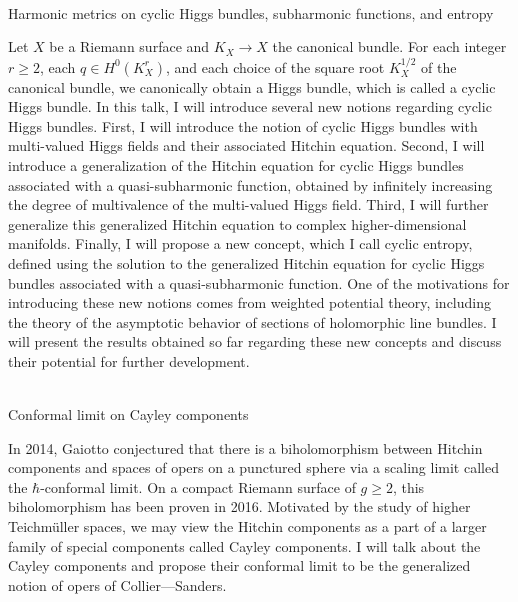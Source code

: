\documentclass[dvipdfmx,a4paper,12pt]{article}
\theoremstyle{plain} %
\theoremstyle{definition} %
\begin{document}
\\
Harmonic metrics on cyclic Higgs bundles, subharmonic functions, and entropy

\vskip1mm
Let $X$ be a Riemann surface and $K_X \rightarrow X$ the canonical bundle. For each integer $r \geq 2$, each $q \in H^0(K_X^r)$, and each choice of the square root $K_X^{1/2}$ of the canonical bundle, we canonically obtain a Higgs bundle, which is called a cyclic Higgs bundle. In this talk, I will introduce several new notions regarding cyclic Higgs bundles. First, I will introduce the notion of cyclic Higgs bundles with multi-valued Higgs fields and their associated Hitchin equation. Second, I will introduce a generalization of the Hitchin equation for cyclic Higgs bundles associated with a quasi-subharmonic function, obtained by infinitely increasing the degree of multivalence of the multi-valued Higgs field. Third, I will further generalize this generalized Hitchin equation to complex higher-dimensional manifolds. Finally, I will propose a new concept, which I call cyclic entropy, defined using the solution to the generalized Hitchin equation for cyclic Higgs bundles associated with a quasi-subharmonic function. One of the motivations for introducing these new notions comes from weighted potential theory, including the theory of the asymptotic behavior of sections of holomorphic line bundles. I will present the results obtained so far regarding these new concepts and discuss their potential for further development.
\vskip5mm

\\
Conformal limit on Cayley components

\vskip1mm
In 2014, Gaiotto conjectured that there is a biholomorphism between Hitchin components and spaces of opers on a punctured sphere via a scaling limit called the $\hbar$-conformal limit. On a compact Riemann surface of $g \ge 2$, this biholomorphism has been proven in 2016. Motivated by the study of higher Teichm\"uller spaces, we may view the Hitchin components as a part of a larger family of special components called Cayley components. I will talk about the Cayley components and propose their conformal limit to be the generalized notion of opers of Collier—Sanders.
\end{document}
